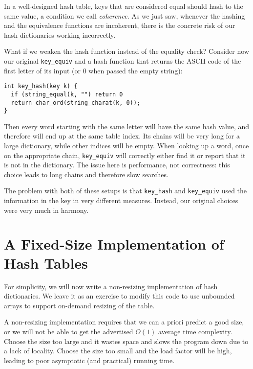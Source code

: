 In a well-designed hash table, keys that are considered equal should
hash to the same value, a condition we call \emph{coherence}.  As we
just saw, whenever the hashing and the equivalence functions are
incoherent, there is the concrete risk of our hash dictionaries
working incorrectly.

\medskip
What if we weaken the hash function instead of the equality check?
Consider now our original \lstinline'key_equiv' and a hash function
that returns the ASCII code of the first letter of its input (or 0
when passed the empty string):
\begin{lstlisting}[language={[C0]C}]
int key_hash(key k) {
  if (string_equal(k, "") return 0
  return char_ord(string_charat(k, 0));
}
\end{lstlisting}
Then every word starting with the same letter will have the same hash
value, and therefore will end up at the same table index.  Its chains
will be very long for a large dictionary, while other indices will
be empty.  When looking up a word, once on the appropriate chain,
\lstinline'key_equiv' will correctly either find it or report that it
is not in the dictionary.  The issue here is performance, not
correctness: this choice leads to long chains and therefore slow
searches.

The problem with both of these setups is that \lstinline'key_hash' and
\lstinline'key_equiv' used the information in the key in very
different measures.  Instead, our original choices were very much in
harmony.


\section{A Fixed-Size Implementation of Hash Tables}
\label{sec:hdict:hash_dict_impl}

For simplicity, we will now write a non-resizing implementation of
hash dictionaries.  We leave it as an exercise to modify this code to
use unbounded arrays to support on-demand resizing of the table.

A non-resizing implementation requires that we can a priori predict a
good size, or we will not be able to get the advertised $O(1)$ average
time complexity.  Choose the size too large and it wastes space and
slows the program down due to a lack of locality.  Choose the size too
small and the load factor will be high, leading to poor asymptotic
(and practical) running time.

